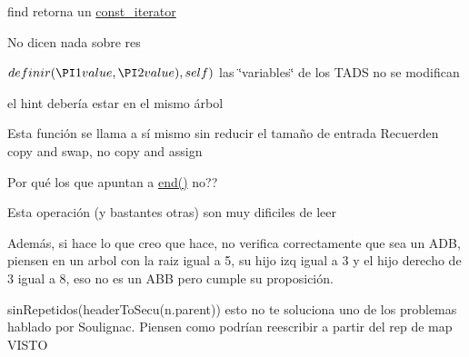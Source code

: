 
\begin{DoxyRefList}
\item[\label{deprecated__deprecated000006}%
\hypertarget{deprecated__deprecated000006}{}%
Miembro \hyperlink{classaed2_1_1map_a0b0a11f906da2926f9eb342fcee79fd7_a0b0a11f906da2926f9eb342fcee79fd7}{aed2\+:\+:map$<$ Key, Meaning, Compare $>$\+:\+:at} (const Key \&key) const ]find retorna un \hyperlink{classaed2_1_1map_1_1const__iterator}{const\+\_\+iterator}  
\item[\label{deprecated__deprecated000008}%
\hypertarget{deprecated__deprecated000008}{}%
Miembro \hyperlink{classaed2_1_1map_ad8e796bf9c9c558e5ce6b61e116253fe_ad8e796bf9c9c558e5ce6b61e116253fe}{aed2\+:\+:map$<$ Key, Meaning, Compare $>$\+:\+:erase} (\hyperlink{classaed2_1_1map_1_1const__iterator}{const\+\_\+iterator} pos)]No dicen nada sobre res 
\item[\label{deprecated__deprecated000007}%
\hypertarget{deprecated__deprecated000007}{}%
Miembro \hyperlink{classaed2_1_1map_a2ef6723c183916276b0afc4a4c721475_a2ef6723c183916276b0afc4a4c721475}{aed2\+:\+:map$<$ Key, Meaning, Compare $>$\+:\+:insert\+\_\+or\+\_\+assign} (\hyperlink{classaed2_1_1map_1_1const__iterator}{const\+\_\+iterator} hint, const value\+\_\+type \&value)]$ definir(\PI1 value, \PI2 value), self) $ las \char`\"{}variables\char`\"{} de los T\+A\+DS no se modifican 
\item[\label{deprecated__deprecated000003}%
\hypertarget{deprecated__deprecated000003}{}%
Miembro \hyperlink{classaed2_1_1map_a7a77950a3d8e637bfa7cf5dcd904f257_a7a77950a3d8e637bfa7cf5dcd904f257}{aed2\+:\+:map$<$ Key, Meaning, Compare $>$\+:\+:map} (const map \&other)]el hint debería estar en el mismo árbol 
\item[\label{deprecated__deprecated000004}%
\hypertarget{deprecated__deprecated000004}{}%
Miembro \hyperlink{classaed2_1_1map_ac606d334809066929522964d45e76317_ac606d334809066929522964d45e76317}{aed2\+:\+:map$<$ Key, Meaning, Compare $>$\+:\+:operator=} (map other)]Esta función se llama a sí mismo sin reducir el tamaño de entrada Recuerden copy and swap, no copy and assign 
\item[\label{deprecated__deprecated000005}%
\hypertarget{deprecated__deprecated000005}{}%
Miembro \hyperlink{classaed2_1_1map_ab22c9a85c2dadbc286cd30e97069a8e6_ab22c9a85c2dadbc286cd30e97069a8e6}{aed2\+:\+:map$<$ Key, Meaning, Compare $>$\+:\+:$\sim$map} ()]Por qué los que apuntan a \hyperlink{classaed2_1_1map_a76023e6a56cb625513e1b5ea028bf983_a76023e6a56cb625513e1b5ea028bf983}{end()} no?? 
\item[\label{deprecated__deprecated000001}%
\hypertarget{deprecated__deprecated000001}{}%
Página \hyperlink{axiomas}{Axiomas y proposiciones auxiliares} ]Esta operación (y bastantes otras) son muy dificiles de leer 

Además, si hace lo que creo que hace, no verifica correctamente que sea un A\+DB, piensen en un arbol con la raiz igual a 5, su hijo izq igual a 3 y el hijo derecho de 3 igual a 8, eso no es un A\+BB pero cumple su proposición.

sin\+Repetidos(header\+To\+Secu(n.\+parent)) esto no te soluciona uno de los problemas hablado por Soulignac. Piensen como podrían reescribir a partir del rep de map V\+I\+S\+TO
\end{DoxyRefList}
